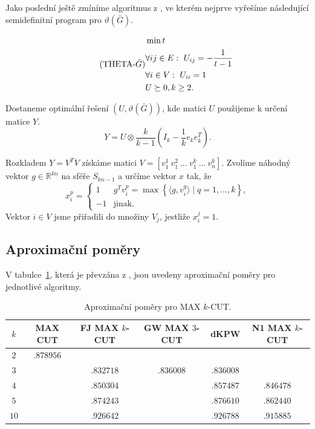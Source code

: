 Jako poslední ještě zmíníme algoritmus z \cite{theta-max-k-cut}, ve kterém nejprve vyřešíme následující semidefinitní program pro $\vartheta(\bar{G})$.

\begin{equation}\tag{THETA-$\bar{G}$}
    \begin{split}
        &\min t \\
        &\forall ij \in E:\ U_{ij} = -\frac{1}{t - 1} \\
        &\forall i \in V:\ U_{ii} = 1 \\
        &U \succeq 0, k \geq 2.
    \end{split}
    \label{eq:THETA-BAR-G}
\end{equation}

\noindent Dostaneme optimální řešení $(U, \vartheta(\bar{G}))$, kde matici $U$ použijeme k určení matice $Y$.
$$
    Y = U \otimes \frac{k}{k - 1} \left( I_k - \frac{1}{k} e_k e_k^T \right).
$$

\noindent Rozkladem $Y = V^TV$ získáme matici $V = \left[ v_1^1\ v_1^2\ \dots\ v_1^k\ \dots\ v_n^k \right]$.
Zvolíme náhodný vektor $g \in \mathbb{R}^{kn}$ na sféře $S_{kn-1}$ a určíme vektor $x$ tak, že
$$
    x_i^p = 
    \begin{cases}
        1  & g^T v_i^p = \max \left\{ \langle g, v_i^q \rangle \mid q = 1, \dots, k \right\}, \\
        -1 & \text{jinak.}
    \end{cases}
$$
Vektor $i \in V$ jsme přiřadili do množiny $V_j$, jestliže $x_i^j = 1$.

\subsection{Aproximační poměry}

V tabulce~\ref{tab:approx-ratio}, která je převzána z \cite{newman}, jsou uvedeny aproximační poměry pro jednotlivé algoritmy.

\begin{table}[h!]
    \begin{center}
        \begin{tabular}{ c | c | c | c | c | c }
            $k$  & MAX CUT & FJ MAX $k$-CUT & GW MAX $3$-CUT & dKPW \cite{theta-max-k-cut} & N1 MAX $k$-CUT \\
            \hline
            $2$  & $.878956$ & $ $ & $ $ & $ $ & $ $ \\
            $3$  & $ $       & $.832718$ & $.836008$ & $.836008$ & $ $ \\
            $4$  & $ $       & $.850304$ & $ $ & $.857487$ & $.846478$ \\
            $5$  & $ $       & $.874243$ & $ $ & $.876610$ & $.862440$ \\
            $10$ & $ $       & $.926642$ & $ $ & $.926788$ & $.915885$ \\
        \end{tabular}
    \end{center}
    \caption{Aproximační poměry pro MAX $k$-CUT.}
    \label{tab:approx-ratio}
\end{table}



